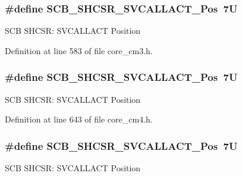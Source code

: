 \subsubsection[{\texorpdfstring{S\+C\+B\+\_\+\+S\+H\+C\+S\+R\+\_\+\+S\+V\+C\+A\+L\+L\+A\+C\+T\+\_\+\+Pos}{SCB_SHCSR_SVCALLACT_Pos}}]{\setlength{\rightskip}{0pt plus 5cm}\#define S\+C\+B\+\_\+\+S\+H\+C\+S\+R\+\_\+\+S\+V\+C\+A\+L\+L\+A\+C\+T\+\_\+\+Pos~7U}\hypertarget{group___c_m_s_i_s___s_c_b_ga977f5176be2bc8b123873861b38bc02f}{}\label{group___c_m_s_i_s___s_c_b_ga977f5176be2bc8b123873861b38bc02f}
S\+CB S\+H\+C\+SR\+: S\+V\+C\+A\+L\+L\+A\+CT Position 

Definition at line 583 of file core\+\_\+cm3.\+h.

\subsubsection[{\texorpdfstring{S\+C\+B\+\_\+\+S\+H\+C\+S\+R\+\_\+\+S\+V\+C\+A\+L\+L\+A\+C\+T\+\_\+\+Pos}{SCB_SHCSR_SVCALLACT_Pos}}]{\setlength{\rightskip}{0pt plus 5cm}\#define S\+C\+B\+\_\+\+S\+H\+C\+S\+R\+\_\+\+S\+V\+C\+A\+L\+L\+A\+C\+T\+\_\+\+Pos~7U}\hypertarget{group___c_m_s_i_s___s_c_b_ga977f5176be2bc8b123873861b38bc02f}{}\label{group___c_m_s_i_s___s_c_b_ga977f5176be2bc8b123873861b38bc02f}
S\+CB S\+H\+C\+SR\+: S\+V\+C\+A\+L\+L\+A\+CT Position 

Definition at line 643 of file core\+\_\+cm4.\+h.

\subsubsection[{\texorpdfstring{S\+C\+B\+\_\+\+S\+H\+C\+S\+R\+\_\+\+S\+V\+C\+A\+L\+L\+A\+C\+T\+\_\+\+Pos}{SCB_SHCSR_SVCALLACT_Pos}}]{\setlength{\rightskip}{0pt plus 5cm}\#define S\+C\+B\+\_\+\+S\+H\+C\+S\+R\+\_\+\+S\+V\+C\+A\+L\+L\+A\+C\+T\+\_\+\+Pos~7U}\hypertarget{group___c_m_s_i_s___s_c_b_ga977f5176be2bc8b123873861b38bc02f}{}\label{group___c_m_s_i_s___s_c_b_ga977f5176be2bc8b123873861b38bc02f}
S\+CB S\+H\+C\+SR\+: S\+V\+C\+A\+L\+L\+A\+CT Position 

